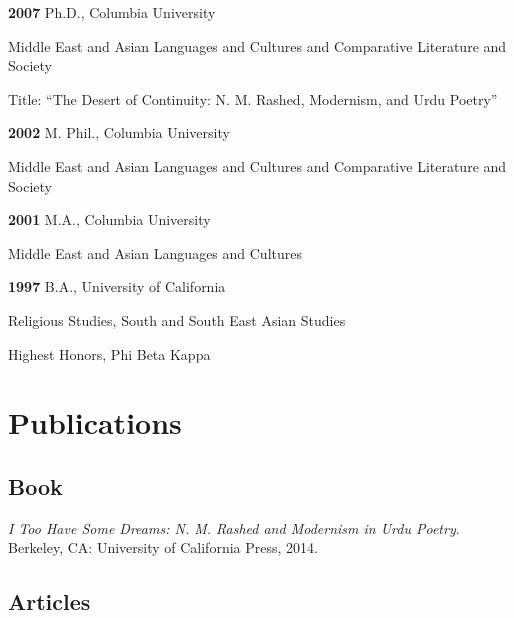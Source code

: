 \documentclass[letterpaper,12pt]{article}
\newenvironment{DUlineblock}[1]{%
    \list{}{\setlength{\partopsep}{\parskip}
            \addtolength{\partopsep}{\baselineskip}
            \setlength{\topsep}{0pt}
            \setlength{\itemsep}{0.15\baselineskip}
            \setlength{\parsep}{0pt}
            \setlength{\leftmargin}{#1}}
    \raggedright
  }
  {\endlist}
\begin{document}
\begin{DUlineblock}{0em}
\item[] \textbf{2007}
Ph.D., Columbia University
\item[]
\begin{DUlineblock}{\DUlineblockindent}
\item[] Middle East and Asian Languages and Cultures and Comparative Literature and Society
\item[] Title: “The Desert of Continuity: N. M. Rashed, Modernism, and Urdu Poetry”
\end{DUlineblock}
\item[] \textbf{2002}
M. Phil., Columbia University
\item[]
\begin{DUlineblock}{\DUlineblockindent}
\item[] Middle East and Asian Languages and Cultures and Comparative Literature and Society
\end{DUlineblock}
\item[] \textbf{2001}
M.A., Columbia University
\item[]
\begin{DUlineblock}{\DUlineblockindent}
\item[] Middle East and Asian Languages and Cultures
\end{DUlineblock}
\item[] \textbf{1997}
B.A., University of California
\item[]
\begin{DUlineblock}{\DUlineblockindent}
\item[] Religious Studies, South and South East Asian Studies
\item[] Highest Honors, Phi Beta Kappa
\end{DUlineblock}
\end{DUlineblock}


\section{Publications%
  \label{publications}%
}


\subsection{Book%
  \label{book}%
}

\emph{I Too Have Some Dreams: N. M. Rashed and Modernism in Urdu Poetry}.
Berkeley, CA: University of California Press, 2014.


\subsection{Articles%
  \label{articles}%
}
\end{document}
